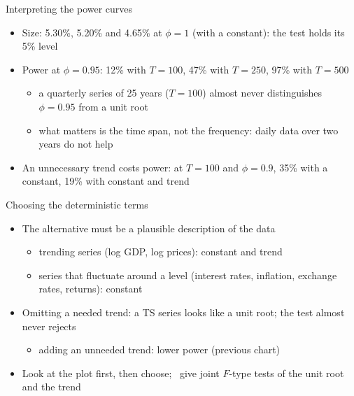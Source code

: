\begin{frame}{Interpreting the power curves}
\itemsize{\small}
\begin{itemize}
    \item Size: 5.30\%, 5.20\% and 4.65\% at $\phi = 1$ (with a constant): the test holds its 5\% level
    \item Power at $\phi = 0.95$: 12\% with $T = 100$, 47\% with $T = 250$, 97\% with $T = 500$
    \begin{itemize}
        \item a quarterly series of 25 years ($T = 100$) almost never distinguishes $\phi = 0.95$ from a unit root
        \item what matters is the time span, not the frequency: daily data over two years do not help
    \end{itemize}
    \item An unnecessary trend costs power: at $T = 100$ and $\phi = 0.9$, 35\% with a constant, 19\% with constant and trend
\end{itemize}
\end{frame}

\begin{frame}{Choosing the deterministic terms}
\itemsize{\small}
\begin{itemize}
    \item The alternative must be a plausible description of the data
    \begin{itemize}
        \item trending series (log GDP, log prices): constant and trend
        \item series that fluctuate around a level (interest rates, inflation, exchange rates, returns): constant
    \end{itemize}
    \item Omitting a needed trend: a TS series looks like a unit root; the test almost never rejects
    \begin{itemize}
        \item adding an unneeded trend: lower power (previous chart)
    \end{itemize}
    \item Look at the plot first, then choose; \ give joint $F$-type tests of the unit root and the trend
\end{itemize}
\end{frame}

